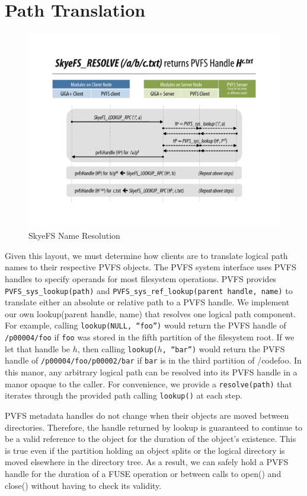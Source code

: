\documentclass[letterpaper]{article}
\newcommand{\code}[1]{\texttt{#1}}
\begin{document}
\section{Path Translation}
\begin{figure}
\begin{center}
\includegraphics[scale=0.4]{figure-resolve}
\end{center}
\caption{SkyeFS Name Resolution}
\end{figure}
Given this layout, we must determine how clients are to translate logical
path names to their respective PVFS objects.  The PVFS system interface uses PVFS
handles to specify operands for most filesystem operations.  PVFS provides
\code{PVFS\_\-sys\_\-lookup(path)} and \code{PVFS\_\-sys\_\-ref\_\-lookup(parent handle, name)}
to translate either an absolute or relative path to a PVFS handle.  We implement
our own lookup(parent handle, name) that resolves one logical path component.
For example, calling \code{lookup(NULL, ``foo'')} would return the PVFS handle
of \code{/p00004/foo} if \code{foo} was stored in the fifth partition of the
filesystem root.  If we let that handle be $h$, then calling \code{lookup($h$,
``bar'')} would return the PVFS handle of \code{/p00004/foo/p00002/bar} if
\code{bar} is in the third partition of /code{foo}.  In this manor, any
arbitrary logical path can be resolved into its PVFS handle in a manor opaque to
the caller.  For convenience, we provide a \code{resolve(path)} that iterates
through the provided path calling \code{lookup()} at each step.

PVFS metadata handles do not change when their objects are moved between
directories.  Therefore, the handle returned by lookup is guaranteed to continue
to be a valid reference to the object for the duration of the object's
existence.  This is true even if the partition holding an object splits or the
logical directory is moved elsewhere in the directory tree.  As a result, we can
safely hold a PVFS handle for the duration of a FUSE operation or between calls
to open() and close() without having to check its validity.
\end{document}
